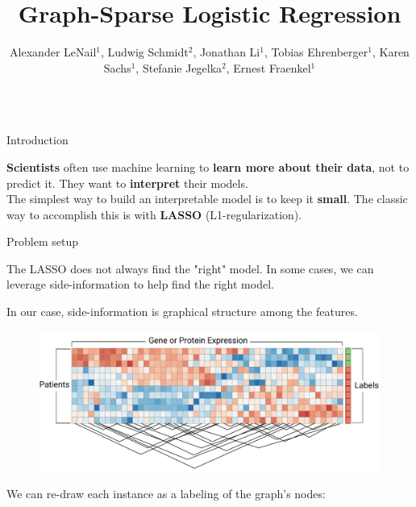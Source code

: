 \documentclass[svgnames,final]{beamer}
\title{Graph-Sparse Logistic Regression}
\author{Alexander LeNail$^1$, Ludwig Schmidt$^2$, Jonathan Li$^1$, Tobias Ehrenberger$^1$, Karen Sachs$^1$, Stefanie Jegelka$^2$, Ernest Fraenkel$^1$}
\institute{$^1$MIT BE, $^2$MIT CSAIL}
\begin{document}
\begin{frame}
\vspace{-.5cm}
\begin{columns}[T]

\begin{column}{.3\linewidth}

	\begin{block}{Introduction}

		\textbf{Scientists} often use machine learning to \textbf{learn more about their data},
		not to predict it. They want to \textbf{interpret} their models. \\

		The simplest way to build an interpretable model is to keep it \textbf{small}.
		The classic way to accomplish this is with \textbf{LASSO} (L1-regularization).

	\end{block}

	\vspace{2cm}

	\begin{block}{Problem setup}

		The LASSO does not always find the "right" model. In some cases,
		we can leverage side-information to help find the right model.

		\vspace{.5cm}

		In our case, side-information is graphical structure among the features.

		\begin{figure}[h]
		\centering
		\includegraphics[width=\linewidth]{images/matrix.pdf}
		\end{figure}

		We can re-draw each instance as a labeling of the graph's nodes:


\end{block}
\end{column}
\end{columns}
\end{frame}
\end{document}
